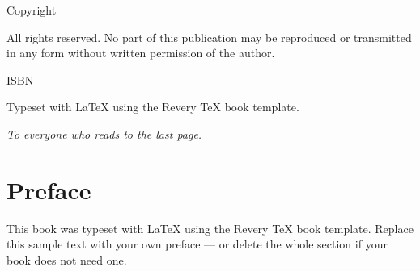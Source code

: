 \expandafter\documentclass\expandafter[\ClassOpts]{book}
\makeatletter
\theoremstyle{definition}
\theoremstyle{remark}
\newcommand{\IfNonEmpty}[2]{%
  \def\hrv@test{#1}%
  \if\relax\hrv@test\relax
    \expandafter\@gobble
  \else
    \expandafter\@firstofone
  \fi
  {#2}}
\makeatother
\begin{document}
\thispagestyle{empty}
\vspace*{\fill}
\begin{small}
  \noindent
  Copyright \textcopyright{} \BookYear\ \BookAuthor\par
  \vspace{6pt}
  All rights reserved. No part of this publication may be reproduced
  or transmitted in any form without written permission of the
  author.\par
  \vspace{6pt}
  \IfNonEmpty{\BookISBN}{ISBN \BookISBN\par\vspace{6pt}}%
  Typeset with \LaTeX{} using the Revery TeX book template.\par
\end{small}
\vspace*{\fill}
\cleardoublepage

\thispagestyle{empty}
\vspace*{5cm}
\begin{center}
  \itshape To everyone who reads to the last page.
\end{center}
\cleardoublepage

\tableofcontents
\cleardoublepage


\chapter*{Preface}

This book was typeset with \LaTeX{} using the Revery TeX book
template. Replace this sample text with your own preface — or delete
the whole section if your book does not need one.
\end{document}
